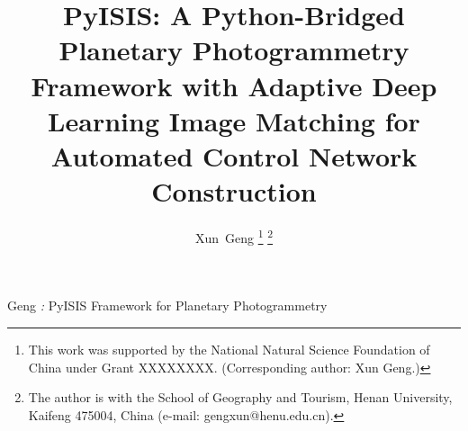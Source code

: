 \documentclass[lettersize,journal]{IEEEtran}
\begin{document}
\title{PyISIS: A Python-Bridged Planetary Photogrammetry Framework with Adaptive Deep Learning Image Matching for Automated Control Network Construction}

\author{Xun~Geng%
\thanks{This work was supported by the National Natural Science Foundation of China under Grant XXXXXXXX. (Corresponding author: Xun Geng.)}%
\thanks{The author is with the School of Geography and Tourism, Henan University, Kaifeng 475004, China (e-mail: gengxun@henu.edu.cn).}
}

%
{Geng \MakeLowercase{\textit{\huge:}} PyISIS Framework for Planetary Photogrammetry}


\maketitle
\end{document}
